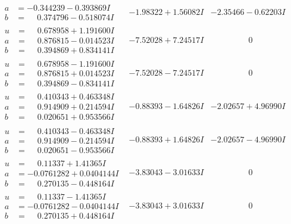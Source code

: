 \documentclass[1p]{elsarticle_modified}
\theoremstyle{definition}
\begin{document}
$$\begin{array}{c|c|c}
\begin{aligned}
a &= -0.344239 - 0.393869 I \\
b &= \phantom{-}0.374796 - 0.518074 I\end{aligned}
 & -1.98322 + 1.56082 I & -2.35466 - 0.62203 I \\ \hline\begin{aligned}
u &= \phantom{-}0.678958 + 1.191600 I \\
a &= \phantom{-}0.876815 - 0.014523 I \\
b &= \phantom{-}0.394869 + 0.834141 I\end{aligned}
 & -7.52028 + 7.24517 I & \phantom{-0.000000 } 0 \\ \hline\begin{aligned}
u &= \phantom{-}0.678958 - 1.191600 I \\
a &= \phantom{-}0.876815 + 0.014523 I \\
b &= \phantom{-}0.394869 - 0.834141 I\end{aligned}
 & -7.52028 - 7.24517 I & \phantom{-0.000000 } 0 \\ \hline\begin{aligned}
u &= \phantom{-}0.410343 + 0.463348 I \\
a &= \phantom{-}0.914909 + 0.214594 I \\
b &= \phantom{-}0.020651 + 0.953566 I\end{aligned}
 & -0.88393 - 1.64826 I & -2.02657 + 4.96990 I \\ \hline\begin{aligned}
u &= \phantom{-}0.410343 - 0.463348 I \\
a &= \phantom{-}0.914909 - 0.214594 I \\
b &= \phantom{-}0.020651 - 0.953566 I\end{aligned}
 & -0.88393 + 1.64826 I & -2.02657 - 4.96990 I \\ \hline\begin{aligned}
u &= \phantom{-}0.11337 + 1.41365 I \\
a &= -0.0761282 + 0.0404144 I \\
b &= \phantom{-}0.270135 - 0.448164 I\end{aligned}
 & -3.83043 - 3.01633 I & \phantom{-0.000000 } 0 \\ \hline\begin{aligned}
u &= \phantom{-}0.11337 - 1.41365 I \\
a &= -0.0761282 - 0.0404144 I \\
b &= \phantom{-}0.270135 + 0.448164 I\end{aligned}
 & -3.83043 + 3.01633 I & \phantom{-0.000000 } 0 \\ \hline\begin{aligned}

\end{aligned}
\end{array}$$
\end{document}
